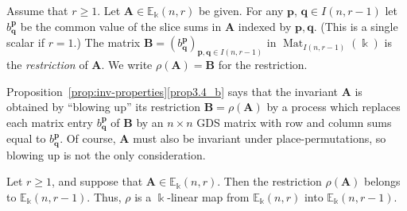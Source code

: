 \documentclass[ALCO,ThmDefs,Unicode,epreuves]{cedram}
\DeclareMathOperator{\Mat}{Mat}
\newcommand{\E}{\mathbb{E}}
\newcommand{\bp}{{\boldsymbol{p}}}
\newcommand{\bq}{{\boldsymbol{q}}}
\newcommand{\bA}{\mathbf{A}}
\newcommand{\bB}{\mathbf{B}}
\begin{document}
\begin{defi}\label{def:restr}
 Assume that $r \ge 1$. Let $\bA \in \E_\Bbbk(n,r)$ be given. For
 any $\bp$, $\bq \in I(n,r-1)$ let $b^\bp_\bq$ be the common value of
 the slice sums in $\bA$ indexed by $\bp, \bq$. (This is a single
 scalar if $r=1$.) The matrix $\bB = (b^\bp_\bq)_{\bp,\bq \in
 I(n,r-1)}$ in $\Mat_{I(n,r-1)}(\Bbbk)$ is the \emph{restriction}
 of $\bA$. We write $\rho(\bA) = \bB$ for the restriction.
\end{defi}

Proposition~\ref{prop:inv-properties}\ref{prop3.4_b} says that the invariant
$\bA$ is obtained by ``blowing up'' its restriction $\bB = \rho(\bA)$
by a process which replaces each matrix entry $b^\bp_\bq$ of $\bB$ by
an $n \times n$ GDS matrix with row and column sums equal to
$b^\bp_\bq$. Of course, $\bA$ must also be invariant under
place-permutations, so blowing up is not the only consideration.

\begin{prop}\label{prop:restr-is-invariant}
 Let $r \ge 1$, and suppose that $\bA \in \E_\Bbbk(n,r)$. Then the
 restriction $\rho(\bA)$ belongs to $\E_\Bbbk(n,r-1)$. Thus, $\rho$
 is a $\Bbbk$-linear map from $\E_\Bbbk(n,r)$ into $\E_\Bbbk(n,r-1)$.
\end{prop}
\end{document}
